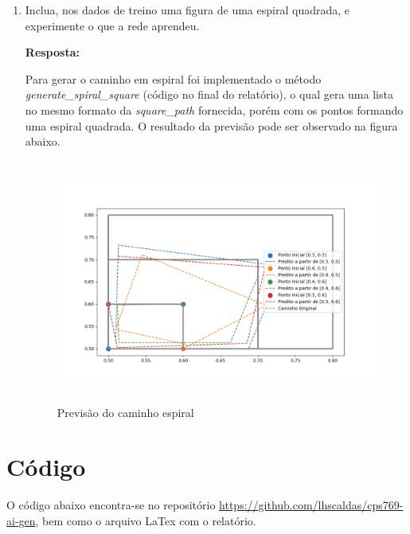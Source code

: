 \documentclass[12 pt]{article}
\begin{document}
\begin{enumerate}
    \item Inclua, nos dados de treino uma figura de uma espiral quadrada, e experimente o que a rede aprendeu.
        
    \textbf{Resposta:} \par

    Para gerar o caminho em espiral foi implementado o método \textit{generate\_spiral\_square} (código no final do relatório), o qual gera uma lista no mesmo formato da \textit{square\_path} fornecida, porém com os pontos formando uma espiral quadrada. O resultado da previsão pode ser observado na figura abaixo.

    \begin{figure}[H]
        \caption{Previsão do caminho espiral}
           \centering
           \includegraphics[height=8cm]{fig/Item_7.png}
    \end{figure}

\end{enumerate}

\section*{Código}

O código abaixo encontra-se no repositório \href{https://github.com/lhscaldas/cps769-ai-gen}{https://github.com/lhscaldas/cps769-ai-gen}, bem como o arquivo LaTex com o relatório.



\end{document}
